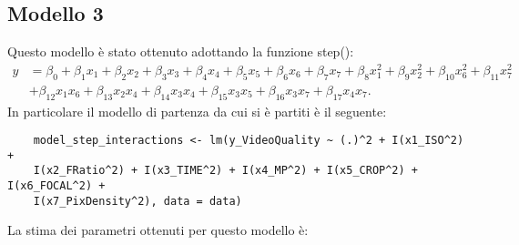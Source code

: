 \subsection{Modello 3}
Questo modello è stato ottenuto adottando la funzione step():
\begin{align*}
	y &= \beta_0 
	+ \beta_1 x_1 + \beta_2 x_2 + \beta_3 x_3 + \beta_4 x_4 + \beta_5 x_5 
	+ \beta_6 x_6 + \beta_7 x_7 
	+ \beta_8 x_1^2 + \beta_9 x_2^2 + \beta_{10} x_6^2 + \beta_{11} x_7^2 \\
	&+ \beta_{12} x_1 x_6 + \beta_{13} x_2 x_4 + \beta_{14} x_3 x_4 
	+ \beta_{15} x_3 x_5 + \beta_{16} x_3 x_7 
	+ \beta_{17} x_4 x_7.
\end{align*}
In particolare il modello di partenza da cui si è partiti è il seguente:
\begin{verbatim}
	model_step_interactions <- lm(y_VideoQuality ~ (.)^2 + I(x1_ISO^2) + 
	I(x2_FRatio^2) + I(x3_TIME^2) + I(x4_MP^2) + I(x5_CROP^2) + I(x6_FOCAL^2) + 
	I(x7_PixDensity^2), data = data)
\end{verbatim}
La stima dei parametri ottenuti per questo modello è:
